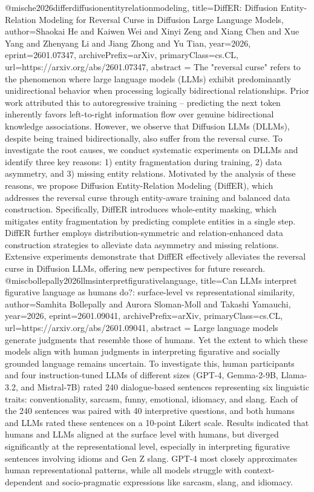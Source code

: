 {}@misc{he2026differdiffusionentityrelationmodeling,
      title={DiffER: Diffusion Entity-Relation Modeling for Reversal Curse in Diffusion Large Language Models}, 
      author={Shaokai He and Kaiwen Wei and Xinyi Zeng and Xiang Chen and Xue Yang and Zhenyang Li and Jiang Zhong and Yu Tian},
      year={2026},
      eprint={2601.07347},
      archivePrefix={arXiv},
      primaryClass={cs.CL},
      url={https://arxiv.org/abs/2601.07347},
      abstract = {The "reversal curse" refers to the phenomenon where large language models (LLMs) exhibit predominantly unidirectional behavior when processing logically bidirectional relationships. Prior work attributed this to autoregressive training -- predicting the next token inherently favors left-to-right information flow over genuine bidirectional knowledge associations. However, we observe that Diffusion LLMs (DLLMs), despite being trained bidirectionally, also suffer from the reversal curse. To investigate the root causes, we conduct systematic experiments on DLLMs and identify three key reasons: 1) entity fragmentation during training, 2) data asymmetry, and 3) missing entity relations. Motivated by the analysis of these reasons, we propose Diffusion Entity-Relation Modeling (DiffER), which addresses the reversal curse through entity-aware training and balanced data construction. Specifically, DiffER introduces whole-entity masking, which mitigates entity fragmentation by predicting complete entities in a single step. DiffER further employs distribution-symmetric and relation-enhanced data construction strategies to alleviate data asymmetry and missing relations. Extensive experiments demonstrate that DiffER effectively alleviates the reversal curse in Diffusion LLMs, offering new perspectives for future research.}
}@misc{bollepally2026llmsinterpretfigurativelanguage,
      title={Can LLMs interpret figurative language as humans do?: surface-level vs representational similarity}, 
      author={Samhita Bollepally and Aurora Sloman-Moll and Takashi Yamauchi},
      year={2026},
      eprint={2601.09041},
      archivePrefix={arXiv},
      primaryClass={cs.CL},
      url={https://arxiv.org/abs/2601.09041},
      abstract = {Large language models generate judgments that resemble those of humans. Yet the extent to which these models align with human judgments in interpreting figurative and socially grounded language remains uncertain. To investigate this, human participants and four instruction-tuned LLMs of different sizes (GPT-4, Gemma-2-9B, Llama-3.2, and Mistral-7B) rated 240 dialogue-based sentences representing six linguistic traits: conventionality, sarcasm, funny, emotional, idiomacy, and slang. Each of the 240 sentences was paired with 40 interpretive questions, and both humans and LLMs rated these sentences on a 10-point Likert scale. Results indicated that humans and LLMs aligned at the surface level with humans, but diverged significantly at the representational level, especially in interpreting figurative sentences involving idioms and Gen Z slang. GPT-4 most closely approximates human representational patterns, while all models struggle with context-dependent and socio-pragmatic expressions like sarcasm, slang, and idiomacy.}
}
